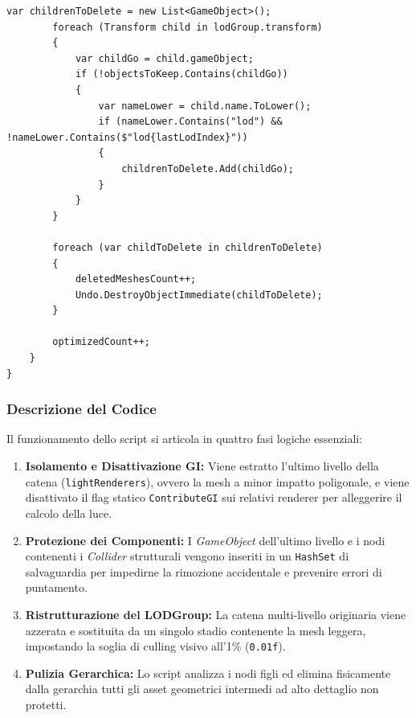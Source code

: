 \begin{lstlisting}[language=pseudo, caption={Pseudo-code dello LOD Stripper.}]
        var childrenToDelete = new List<GameObject>();
        foreach (Transform child in lodGroup.transform)
        {
            var childGo = child.gameObject;
            if (!objectsToKeep.Contains(childGo))
            {
                var nameLower = child.name.ToLower();
                if (nameLower.Contains("lod") && !nameLower.Contains($"lod{lastLodIndex}"))
                {
                    childrenToDelete.Add(childGo);
                }
            }
        }

        foreach (var childToDelete in childrenToDelete)
        {
            deletedMeshesCount++;
            Undo.DestroyObjectImmediate(childToDelete);
        }

        optimizedCount++;
    }
}
\end{lstlisting}

\subsubsection{Descrizione del Codice}

Il funzionamento dello script si articola in quattro fasi logiche essenziali:

\begin{enumerate}
    \item \textbf{Isolamento e Disattivazione GI:} Viene estratto l'ultimo livello della catena (\lstinline|lightRenderers|), ovvero la mesh a minor impatto poligonale, e viene disattivato il flag statico \lstinline|ContributeGI| sui relativi renderer per alleggerire il calcolo della luce.
    
    \item \textbf{Protezione dei Componenti:} I \textit{GameObject} dell'ultimo livello e i nodi contenenti i \textit{Collider} strutturali vengono inseriti in un \lstinline|HashSet| di salvaguardia per impedirne la rimozione accidentale e prevenire errori di puntamento.
    
    \item \textbf{Ristrutturazione del LODGroup:} La catena multi-livello originaria viene azzerata e sostituita da un singolo stadio contenente la mesh leggera, impostando la soglia di culling visivo all'1\% (\lstinline|0.01f|).
    
    \item \textbf{Pulizia Gerarchica:} Lo script analizza i nodi figli ed elimina fisicamente dalla gerarchia tutti gli asset geometrici intermedi ad alto dettaglio non protetti.
\end{enumerate}

